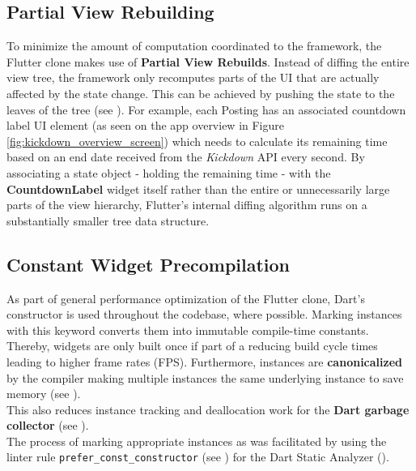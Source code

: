 \subsection{Partial View Rebuilding}
To minimize the amount of computation coordinated to the framework, the Flutter clone makes use of \textbf{Partial View Rebuilds}. 
Instead of diffing the entire view tree, the framework only recomputes parts of the UI that are actually affected by the state change. 
This can be achieved by pushing the state to the leaves of the tree (see \cite{StatefulWidgetPerformance2021}).
For example, each Posting has an associated countdown label UI element (as seen on the app overview in Figure \ref{fig:kickdown_overview_screen}) which needs to calculate its remaining time based on an end date received from the \textit{Kickdown} API every second.
By associating a state object - holding the remaining time - with the \textbf{CountdownLabel} widget itself rather than the entire or unnecessarily large parts of the view hierarchy, Flutter's internal diffing algorithm runs on a substantially smaller tree data structure.

\subsection{Constant Widget Precompilation} \label{section::constant_widget_precompilation}
As part of general performance optimization of the Flutter clone, Dart's  constructor is used throughout the codebase, where possible.
Marking instances with this keyword converts them into immutable compile-time constants.
Thereby,  widgets are only built once if part of a  reducing build cycle times leading to higher frame rates (FPS).
Furthermore, instances are \textbf{canonicalized} by the compiler making multiple instances the same underlying instance to save memory (see \cite{DartConstDocumentation}).\\
This also reduces instance tracking and deallocation work for the \textbf{Dart garbage collector} (see \cite{DartGarbageCollector2021}).\\
The process of marking appropriate instances as  was facilitated by using the linter rule \texttt{prefer\_const\_constructor} (see \cite{ConstLinterRule2021}) for the Dart Static Analyzer (\cite{DartCodeAnalysis2021}). 

